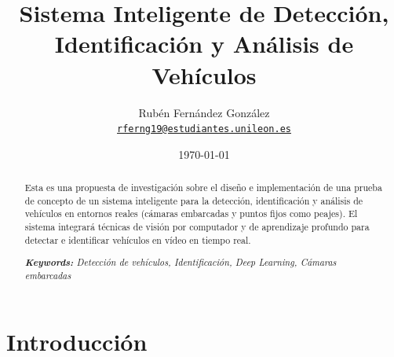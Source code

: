 \documentclass[11pt]{article}
\title{Sistema Inteligente de Detección, Identificación y Análisis de Vehículos
}
\author{Rubén Fernández González\\
    \href{mailto:rferng19@estudiantes.unileon.es}{\texttt{rferng19@estudiantes.unileon.es}
    }
}
\date{\today}
\begin{document}
{
\maketitle
\begin{abstract}
Esta es una propuesta de investigación sobre el diseño e implementación de una prueba de concepto de un sistema inteligente para la detección, identificación y análisis de vehículos en entornos reales (cámaras embarcadas y puntos fijos como peajes). El sistema integrará técnicas de visión por computador y de aprendizaje profundo para detectar e identificar vehículos en vídeo en tiempo real.


\textit{\textbf{Keywords: } Detección de vehículos, Identificación, Deep Learning, Cámaras embarcadas} \\ %
\noindent

\end{abstract}
}






\section{Introducción}
\end{document}
